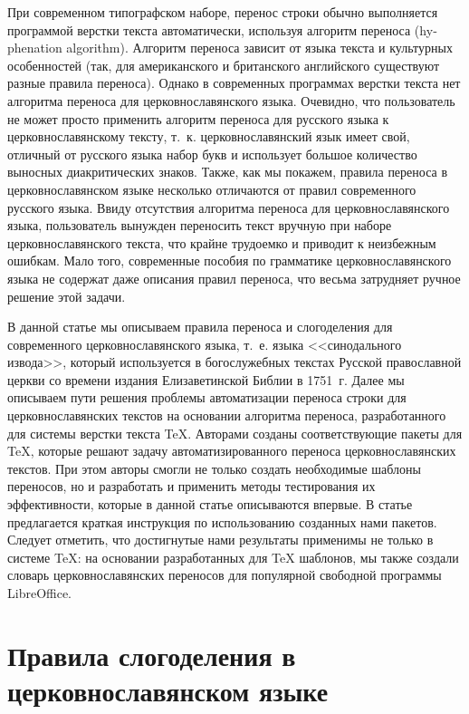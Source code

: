 \documentclass[12pt,a4paper,oneside]{extarticle}
\begin{document}
При современном типографском наборе, перенос строки обычно выполняется программой верстки текста автоматически, используя алгоритм переноса (\textenglish{hyphenation algorithm}). Алгоритм переноса зависит от языка текста и культурных особенностей (так, для американского и британского английского существуют разные правила переноса). Однако в современных программах верстки текста нет алгоритма переноса для церковнославянского языка. Очевидно, что пользователь не может просто применить алгоритм переноса для русского языка к церковнославянскому тексту, т.~к. церковнославянский язык имеет свой, отличный от русского языка набор букв и использует большое количество выносных диакритических знаков. Также, как мы покажем, правила переноса в церковнославянском языке несколько отличаются от правил современного русского языка. Ввиду отсутствия алгоритма переноса для церковнославянского языка, пользователь вынужден переносить текст вручную при наборе церковнославянского текста, что крайне трудоемко и приводит к неизбежным ошибкам. Мало того, современные пособия по грамматике церковнославянского языка не содержат даже описания правил переноса, что весьма затрудняет ручное решение  этой задачи.

В данной статье мы описываем правила переноса и слогоделения для современного церковнославянского языка, т.~е. языка <<синодального извода>>, который используется в богослужебных текстах Русской православной церкви со времени издания Елизаветинской Библии в 1751~г. Далее мы описываем пути решения проблемы автоматизации переноса строки для церковнославянских текстов на основании алгоритма переноса, разработанного для системы верстки текста \TeX{}. Авторами созданы соответствующие пакеты для \TeX{}, которые решают задачу автоматизированного переноса церковнославянских текстов. При этом авторы смогли не только создать необходимые шаблоны переносов, но и разработать и применить методы тестирования их эффективности, которые в данной статье описываются впервые. В статье предлагается краткая инструкция по использованию созданных нами пакетов. Следует отметить, что достигнутые нами результаты применимы не только в системе \TeX{}: на основании разработанных для \TeX{} шаблонов, мы также создали словарь церковнославянских переносов для популярной свободной программы LibreOffice.

\section{Правила слогоделения в церковнославянском языке}
\end{document}

